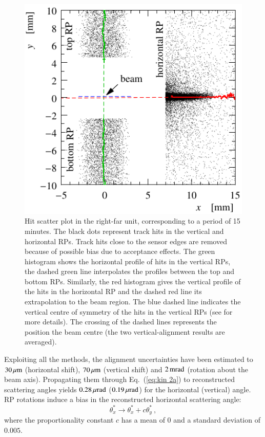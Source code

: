 \begin{figure}
\begin{center}
\includegraphics{fig/alignment_method.pdf}
\caption{%
Hit scatter plot in the right-far unit, corresponding to a period of 15 minutes. The black dots represent track hits in the vertical and horizontal RPs. Track hits close to the sensor edges are removed because of possible bias due to acceptance effects.
The green histogram shows the horizontal profile of hits in the vertical RPs, the dashed green line interpolates the profiles between the top and bottom RPs. Similarly, the red histogram gives the vertical profile of the hits in the horizontal RP and the dashed red line its extrapolation to the beam region. The blue dashed line indicates the vertical centre of symmetry of the hits in the vertical RPs (see \cite{totem-ijmp} for more details). The crossing of the dashed lines represents the position the beam centre (the two vertical-alignment results are averaged).
}
\label{fig:align meth}
\end{center}
\end{figure}

Exploiting all the methods, the alignment uncertainties have been estimated to $30\,{\rm \mu m}$ (horizontal shift), $70\,{\rm \mu m}$ (vertical shift) and $2\,{\rm m rad}$ (rotation about the beam axis). Propagating them through Eq.~(\ref{eq:kin 2a}) to reconstructed scattering angles yields $0.28\,{\rm \mu rad}$ ($0.19\,{\rm \mu rad}$) for the horizontal (vertical) angle. RP rotations induce a bias in the reconstructed horizontal scattering angle:
\begin{equation}
\label{eq:alig rot bias}
	\theta_x^* \rightarrow \theta_x^* + c \theta_y^*\ ,
\end{equation}
where the proportionality constant $c$ has a mean of 0 and a standard deviation of $0.005$.


